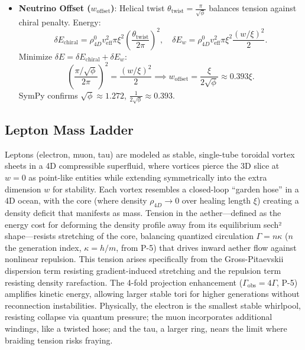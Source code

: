 \begin{itemize}
\item \textbf{Neutrino Offset (\(w_{\text{offset}}\))}: Helical twist \(\theta_{\text{twist}} = \frac{\pi}{\sqrt{\phi}}\) balances tension against chiral penalty. Energy:
  \[
  \delta E_{\text{chiral}} = \rho_{4D}^0 v_{\text{eff}}^2 \pi \xi^2 \left( \frac{\theta_{\text{twist}}}{2\pi} \right)^2, \quad \delta E_w = \rho_{4D}^0 v_{\text{eff}}^2 \pi \xi^2 \frac{(w / \xi)^2}{2}.
  \]
  Minimize \(\delta E = \delta E_{\text{chiral}} + \delta E_w\):
  \[
  \left( \frac{\pi / \sqrt{\phi}}{2\pi} \right)^2 = \frac{(w / \xi)^2}{2} \implies w_{\text{offset}} = \frac{\xi}{2 \sqrt{\phi}} \approx 0.393 \xi.
  \]
  SymPy confirms \(\sqrt{\phi} \approx 1.272\), \(\frac{1}{2 \sqrt{\phi}} \approx 0.393\).
\end{itemize}


\subsection{Lepton Mass Ladder}
\label{sec:leptons}

Leptons (electron, muon, tau) are modeled as stable, single-tube toroidal vortex sheets in a 4D compressible superfluid, where vortices pierce the 3D slice at $w=0$ as point-like entities while extending symmetrically into the extra dimension $w$ for stability. Each vortex resembles a closed-loop ``garden hose'' in a 4D ocean, with the core (where density $\rho_{4D} \to 0$ over healing length $\xi$) creating a density deficit that manifests as mass. Tension in the aether—defined as the energy cost for deforming the density profile away from its equilibrium sech² shape—resists stretching of the core, balancing quantized circulation $\Gamma = n \kappa$ ($n$ the generation index, $\kappa = h / m$, from P-5) that drives inward aether flow against nonlinear repulsion. This tension arises specifically from the Gross-Pitaevskii dispersion term resisting gradient-induced stretching and the repulsion term resisting density rarefaction. The 4-fold projection enhancement ($\Gamma_{\text{obs}} = 4\Gamma$, P-5) amplifies kinetic energy, allowing larger stable tori for higher generations without reconnection instabilities. Physically, the electron is the smallest stable whirlpool, resisting collapse via quantum pressure; the muon incorporates additional windings, like a twisted hose; and the tau, a larger ring, nears the limit where braiding tension risks fraying.

